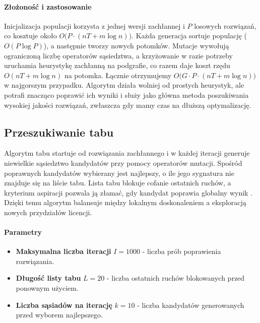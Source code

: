 \paragraph{Złożoność i zastosowanie}
Inicjalizacja populacji korzysta z jednej wersji zachłannej i $P$ losowych rozwiązań, co kosztuje około $O\bigl(P \cdot (nT + m\log n)\bigr)$. Każda generacja sortuje populację ($O(P\log P)$), a następnie tworzy nowych potomków. Mutacje wywołują ograniczoną liczbę operatorów sąsiedztwa, a krzyżowanie w razie potrzeby uruchamia heurystykę zachłanną na podgrafie, co razem daje koszt rzędu $O(nT + m\log n)$ na potomka. Łącznie otrzymujemy $O\bigl(G \cdot P \cdot (nT + m\log n)\bigr)$ w najgorszym przypadku. Algorytm działa wolniej od prostych heurystyk, ale potrafi znacząco poprawić ich wyniki i służy jako główna metoda poszukiwania wysokiej jakości rozwiązań, zwłaszcza gdy mamy czas na dłuższą optymalizację.



\subsection{Przeszukiwanie tabu}\label{subsec:tabu}
Algorytm tabu startuje od rozwiązania zachłannego i w każdej iteracji generuje niewielkie sąsiedztwo kandydatów przy pomocy operatorów mutacji. Spośród poprawnych kandydatów wybierany jest najlepszy, o ile jego sygnatura nie znajduje się na liście tabu. Lista tabu blokuje cofanie ostatnich ruchów, a kryterium aspiracji pozwala ją złamać, gdy kandydat poprawia globalny wynik \cite{glover1989}. Dzięki temu algorytm balansuje między lokalnym doskonaleniem a eksploracją nowych przydziałów licencji.

\paragraph{Parametry}
\begin{itemize}
  \item \textbf{Maksymalna liczba iteracji} $I=1000$ - liczba prób poprawienia rozwiązania.
  \item \textbf{Długość listy tabu} $L=20$ - liczba ostatnich ruchów blokowanych przed ponownym użyciem.
  \item \textbf{Liczba sąsiadów na iterację} $k=10$ - liczba kandydatów generowanych przed wyborem najlepszego.
\end{itemize}

